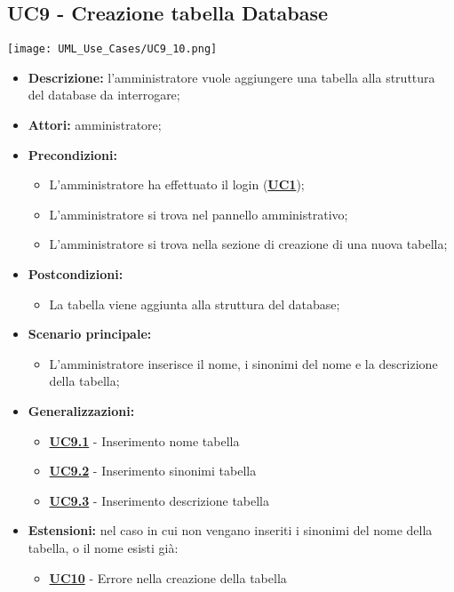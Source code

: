 \subsection{UC9 - Creazione tabella Database}
\label{sec:UC9}
\texttt{[image: UML\_Use\_Cases/UC9\_10.png]}
\begin{itemize}
	\item \textbf{Descrizione:} l’amministratore vuole aggiungere una tabella alla struttura del database da interrogare;
	\item \textbf{Attori:} amministratore;
	\item \textbf{Precondizioni:} 
	\begin{itemize}
		\item L’amministratore ha effettuato il login (\hyperref[sec:UC1]{\textbf{UC1}});
		\item L’amministratore si trova nel pannello amministrativo;
		\item L’amministratore si trova nella sezione di creazione di una nuova tabella;
	\end{itemize}
	\item \textbf{Postcondizioni:} 
	\begin{itemize}
		\item La tabella viene aggiunta alla struttura del database;
	\end{itemize}
	\item \textbf{Scenario principale:} 
	\begin{itemize}
		\item L’amministratore inserisce il nome, i sinonimi del nome e la descrizione della tabella;
	\end{itemize}
	\item \textbf{Generalizzazioni:} 
	\begin{itemize}
		\item \hyperref[sec:UC9.1]{\textbf{UC9.1}} - Inserimento nome tabella
		\item \hyperref[sec:UC9.2]{\textbf{UC9.2}} - Inserimento sinonimi tabella
		\item \hyperref[sec:UC9.3]{\textbf{UC9.3}} - Inserimento descrizione tabella
	\end{itemize}
	\item \textbf{Estensioni:} nel caso in cui non vengano inseriti i sinonimi del nome della tabella, o il nome esisti già:
	\begin{itemize}
		\item \hyperref[sec:UC10]{\textbf{UC10}} - Errore nella creazione della tabella
	\end{itemize}
\end{itemize}

